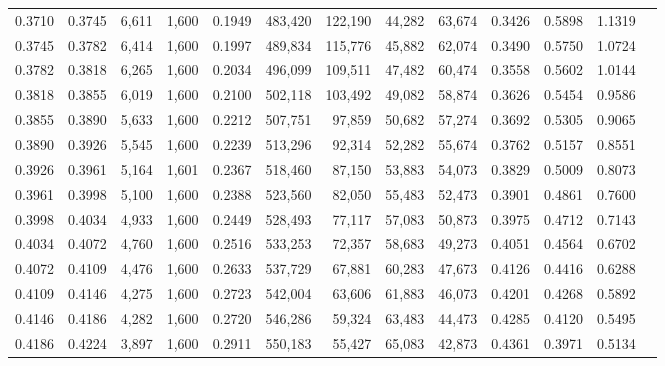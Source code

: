 \begin{tabular}{rrrrrrrrrrrrr}
0.3710 & 0.3745 &  6,611 & 1,600 &                                     0.1949 & 483,420 & 122,190 &  44,282 &  63,674 & 0.3426 & 0.5898 & 1.1319 \\
0.3745 & 0.3782 &  6,414 & 1,600 &                                     0.1997 & 489,834 & 115,776 &  45,882 &  62,074 & 0.3490 & 0.5750 & 1.0724 \\
0.3782 & 0.3818 &  6,265 & 1,600 &                                     0.2034 & 496,099 & 109,511 &  47,482 &  60,474 & 0.3558 & 0.5602 & 1.0144 \\
0.3818 & 0.3855 &  6,019 & 1,600 &                                     0.2100 & 502,118 & 103,492 &  49,082 &  58,874 & 0.3626 & 0.5454 & 0.9586 \\
0.3855 & 0.3890 &  5,633 & 1,600 &                                     0.2212 & 507,751 &  97,859 &  50,682 &  57,274 & 0.3692 & 0.5305 & 0.9065 \\
0.3890 & 0.3926 &  5,545 & 1,600 &                                     0.2239 & 513,296 &  92,314 &  52,282 &  55,674 & 0.3762 & 0.5157 & 0.8551 \\
0.3926 & 0.3961 &  5,164 & 1,601 &                                     0.2367 & 518,460 &  87,150 &  53,883 &  54,073 & 0.3829 & 0.5009 & 0.8073 \\
0.3961 & 0.3998 &  5,100 & 1,600 &                                     0.2388 & 523,560 &  82,050 &  55,483 &  52,473 & 0.3901 & 0.4861 & 0.7600 \\
0.3998 & 0.4034 &  4,933 & 1,600 &                                     0.2449 & 528,493 &  77,117 &  57,083 &  50,873 & 0.3975 & 0.4712 & 0.7143 \\
0.4034 & 0.4072 &  4,760 & 1,600 &                                     0.2516 & 533,253 &  72,357 &  58,683 &  49,273 & 0.4051 & 0.4564 & 0.6702 \\
0.4072 & 0.4109 &  4,476 & 1,600 &                                     0.2633 & 537,729 &  67,881 &  60,283 &  47,673 & 0.4126 & 0.4416 & 0.6288 \\
0.4109 & 0.4146 &  4,275 & 1,600 &                                     0.2723 & 542,004 &  63,606 &  61,883 &  46,073 & 0.4201 & 0.4268 & 0.5892 \\
0.4146 & 0.4186 &  4,282 & 1,600 &                                     0.2720 & 546,286 &  59,324 &  63,483 &  44,473 & 0.4285 & 0.4120 & 0.5495 \\
0.4186 & 0.4224 &  3,897 & 1,600 &                                     0.2911 & 550,183 &  55,427 &  65,083 &  42,873 & 0.4361 & 0.3971 & 0.5134 \\

\end{tabular}
